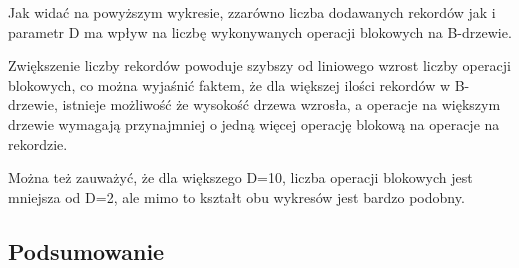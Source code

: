 \documentclass[12pt]{article}
\begin{document}
Jak widać na powyższym wykresie, zzarówno liczba dodawanych rekordów jak i parametr D ma wpływ 
na liczbę wykonywanych operacji blokowych na B-drzewie. 

Zwiększenie liczby rekordów powoduje szybszy od liniowego wzrost liczby operacji blokowych,
co można wyjaśnić faktem, że dla większej ilości rekordów w B-drzewie,
istnieje możliwość że wysokość drzewa wzrosła, a operacje na większym drzewie
wymagają przynajmniej o jedną więcej operację blokową na operacje na rekordzie.

Można też zauważyć, że dla większego D=10, liczba operacji blokowych jest mniejsza od D=2,
ale mimo to kształt obu wykresów jest bardzo podobny.


\subsection{Podsumowanie}
\end{document}
